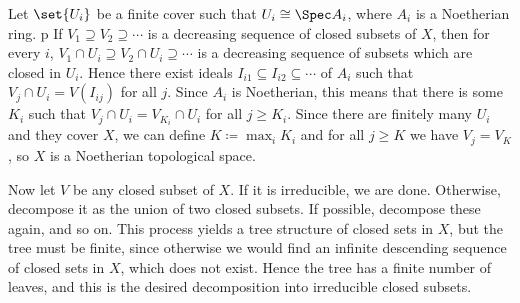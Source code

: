 Let $\set{U_i}$ be a finite cover such that $U_i\cong \Spec A_i$, where $A_i$
is a Noetherian ring.
p
If $V_1 \supseteq V_2\supseteq \cdots$ is a decreasing sequence of closed
subsets of $X$, then for every $i$,
$V_1 \cap U_i\supseteq V_2\cap U_i \supseteq \cdots$ is a decreasing sequence
of subsets which are closed in $U_i$. Hence there exist ideals
$I_{i1} \subseteq I_{i2} \subseteq\cdots$ of $A_i$ such that $V_j\cap U_i = V(I_{ij})$
for all $j$. Since $A_i$ is Noetherian, this means that there is some $K_i$ such
that $V_j\cap U_i = V_{K_i} \cap U_i$ for all $j \geq K_i$. Since there are finitely
many $U_i$ and they cover $X$, we can define $K\coloneqq \max_i K_i$ and
for all $j \geq K$ we have $V_j = V_K$, so $X$ is a Noetherian topological space.

Now let $V$ be any closed subset of $X$. If it is irreducible, we are done.
Otherwise, decompose it as the union of two closed subsets. If possible, decompose
these again, and so on. This process yields a tree structure of closed
sets in $X$, but the tree must be finite, since otherwise we would find an infinite
descending sequence of closed sets in $X$, which does not exist. Hence the tree has
a finite number of leaves, and this is the desired decomposition into irreducible
closed subsets.
